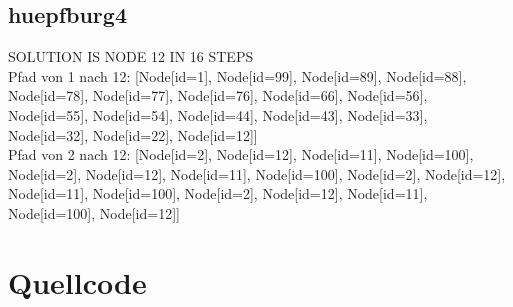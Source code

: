 \subsection{huepfburg4}\label{subsec:huepfburg4}
SOLUTION IS NODE 12 IN 16 STEPS \\
Pfad von 1 nach 12: [Node[id=1], Node[id=99], Node[id=89], Node[id=88], Node[id=78], Node[id=77], Node[id=76], Node[id=66], Node[id=56], Node[id=55], Node[id=54], Node[id=44], Node[id=43], Node[id=33], Node[id=32], Node[id=22], Node[id=12]] \\
Pfad von 2 nach 12: [Node[id=2], Node[id=12], Node[id=11], Node[id=100], Node[id=2], Node[id=12], Node[id=11], Node[id=100], Node[id=2], Node[id=12], Node[id=11], Node[id=100], Node[id=2], Node[id=12], Node[id=11], Node[id=100], Node[id=12]]


\section{Quellcode}\label{sec:quellcode}
